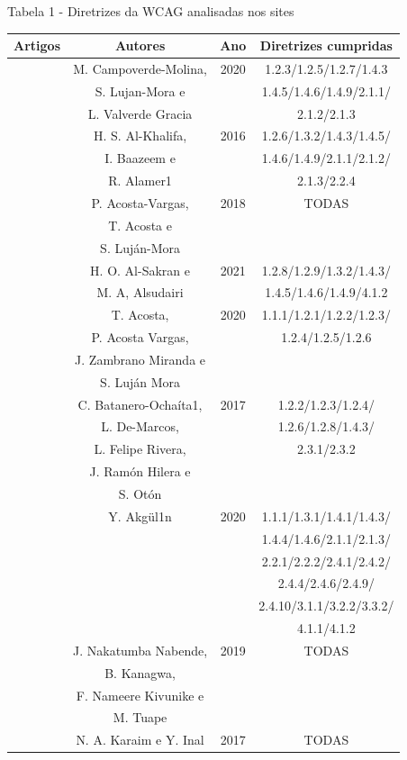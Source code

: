 \documentclass[a4paper]{article}
\begin{document}
\begin{titlepage}
Tabela 1 - Diretrizes da WCAG analisadas nos sites\\[-1cm]
\begin{center}
	\begin{longtable}{|c|c|c|c|}
		\hline
		Artigos & Autores & Ano & Diretrizes cumpridas\\
		\hline
		[1] & M. Campoverde-Molina,& 2020 & 1.2.3/1.2.5/1.2.7/1.4.3\\
			& S. Lujan-Mora e & & 1.4.5/1.4.6/1.4.9/2.1.1/\\
			& L. Valverde Gracia & & 2.1.2/2.1.3\\
		\hline
		[7] & H. S. Al-Khalifa, & 2016 & 1.2.6/1.3.2/1.4.3/1.4.5/\\
			& I. Baazeem e & & 1.4.6/1.4.9/2.1.1/2.1.2/\\
			& R. Alamer1 & & 2.1.3/2.2.4\\
		\hline
		[8] & P. Acosta-Vargas, & 2018 & TODAS\\
			& T. Acosta e & & \\
			& S. Luján-Mora & & \\
		\hline
		[9] & H. O. Al-Sakran e & 2021 & 1.2.8/1.2.9/1.3.2/1.4.3/\\
			& M. A, Alsudairi & & 1.4.5/1.4.6/1.4.9/4.1.2\\
		\hline
		[11] & T. Acosta, & 2020 & 1.1.1/1.2.1/1.2.2/1.2.3/\\
			 & P. Acosta Vargas, & & 1.2.4/1.2.5/1.2.6\\
			 & J. Zambrano Miranda e & & \\
			 & S. Luján Mora & & \\
		\hline
		[12] & C. Batanero-Ochaíta1, & 2017 & 1.2.2/1.2.3/1.2.4/\\
			 & L. De-Marcos, & & 1.2.6/1.2.8/1.4.3/\\
			 & L. Felipe Rivera, & & 2.3.1/2.3.2\\
			 & J. Ramón Hilera e & & \\
			 & S. Otón & & \\
		\hline
		[14] & Y. Akgül1n & 2020 & 1.1.1/1.3.1/1.4.1/1.4.3/\\
			 & & & 1.4.4/1.4.6/2.1.1/2.1.3/\\
			 & & & 2.2.1/2.2.2/2.4.1/2.4.2/\\
			 & & & 2.4.4/2.4.6/2.4.9/\\
			 & & & 2.4.10/3.1.1/3.2.2/3.3.2/\\
			 & & & 4.1.1/4.1.2\\
		\hline
		[15] & J. Nakatumba Nabende, & 2019 & TODAS\\
			 & B. Kanagwa, & &\\
			 & F. Nameere Kivunike e & &\\
			 & M. Tuape & &\\
		\hline
		[17] & N. A. Karaim e Y. Inal & 2017 & TODAS\\
		\hline
	\end{longtable}
\end{center}


\end{titlepage}
\end{document}
